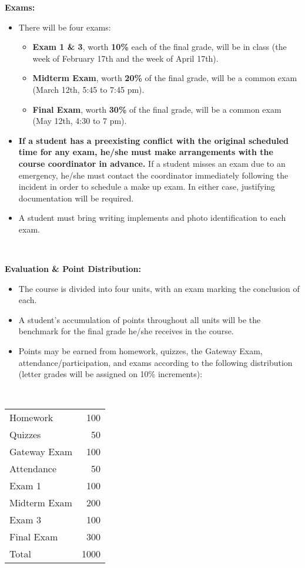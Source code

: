 \documentclass[10pt]{amsart}
\begin{document}
{\bf Exams:}
\begin{itemize}
	\item There will be four exams:
	\begin{itemize}
		\item {\bf Exam 1 \& 3}, worth {\bf 10\%} each of the final grade, will be in class (the week of February 17th and the week of April 17th).
		\item {\bf Midterm Exam}, worth {\bf 20\%} of the final grade, will be a common exam (March 12th, 5:45 to 7:45 pm).
		\item {\bf Final Exam}, worth {\bf 30\%} of the final grade, will be a common exam (May 12th, 4:30 to 7 pm).
	\end{itemize}
	\item {\bf If a student has a preexisting conflict with the original scheduled time for any exam, he/she must make arrangements with the course coordinator in advance.}  If a student misses  an exam due to an emergency, he/she must contact the coordinator immediately following the incident in order to schedule a make up exam.  In either case, justifying documentation will be required.
	\item A student must bring writing implements and photo identification to each exam.
\end{itemize}

\,\,

{\bf Evaluation \& Point Distribution:}
\begin{itemize}
	\item The course is divided into four units, with an exam marking the conclusion of each.
	\item A student's accumulation of points throughout all units will be the benchmark for the final grade he/she receives in the course. 
	\item Points may be earned from homework, quizzes, the Gateway Exam, attendance/participation, and exams according to the following distribution (letter grades will be assigned on 10\% increments):
\end{itemize}

\,\,

\begin{center}
\begin{tabular}{| l | r |}
\hline
Homework \hspace{1cm} & 100  \\
Quizzes & 50 \\
Gateway Exam & 100 \\
Attendance & 50 \\
Exam 1 & 100  \\
Midterm Exam & 200  \\
Exam 3 & 100  \\
Final Exam & 300  \\
\hline
Total  & 1000 \\
\hline
  \end{tabular}
\end{center}
\end{document}
